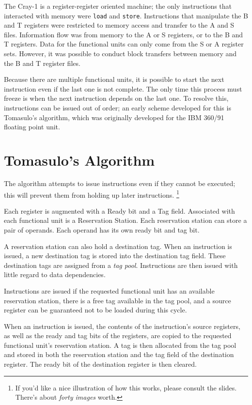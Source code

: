 The Cray-1 is a register-register oriented machine; the only instructions that interacted with memory were \texttt{load} and \texttt{store}. Instructions that manipulate the B and T registers were restricted to memory access and transfer to the A and S files. Information flow was from memory to the A or S registers, or to the B and T registers. Data for the functional units can only come from the S or A register sets. However, it was possible to conduct block transfers between memory and the B and T register files.

Because there are multiple functional units, it is possible to start the next instruction even if the last one is not complete. The only time this process must freeze is when the next instruction depends on the last one. To resolve this, instructions can be issued out of order; an early scheme developed for this is Tomasulo's algorithm, which was originally developed for the IBM 360/91 floating point unit. 

\section{Tomasulo's Algorithm}
The algorithm attempts to issue instructions even if they cannot be executed; this will prevent them from holding up later instructions. \footnote{If you'd like a nice illustration of how this works, please consult the slides. There's about \textit{forty images} worth.}

Each register is augmented with a Ready bit and a Tag field. Associated with each functional unit is a Reservation Station. Each reservation station can store a pair of operands. Each operand has its own ready bit and tag bit.

A reservation station can also hold a destination tag. When an instruction is issued, a new destination tag is stored into the destination tag field. These destination tags are assigned from a \textit{tag pool}. Instructions are then issued with little regard to data dependencies.

Instructions are issued if the requested functional unit has an available reservation station, there is a free tag available in the tag pool, and a source register can be guaranteed not to be loaded during this cycle. 

When an instruction is issued, the contents of the instruction's source registers, as well as the ready and tag bits of the registers, are copied to the requested functional unit's reservation station. A tag is then allocated from the tag pool and stored in both the reservation station and the tag field of the destination register. The ready bit of the destination register is then cleared.

